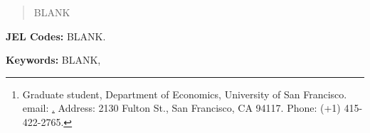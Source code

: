 
\begin{titlepage}

\title{}
\author{Grant X. Storer\thanks{Graduate student, Department of Economics, University of San Francisco. email: \protect\href{gxstorer@usfca.edu}. Address: 2130 Fulton St., San Francisco, CA 94117. Phone: (+1) 415-422-2765.}}

\maketitle

\begin{abstract}

BLANK 
\end{abstract}

\vspace{1cm} 
\textbf{\small{}JEL Codes:}{\small{} BLANK.}{\small\par}

\textbf{\small{}Keywords:}{\small{} BLANK,}{\small\par}


\end{titlepage}